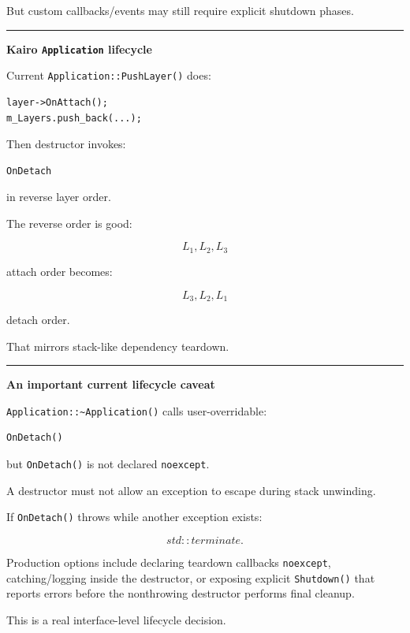 But custom callbacks/events may still require explicit shutdown phases.

\begin{center}\rule{0.5\linewidth}{0.5pt}\end{center}

\textbf{Kairo \texttt{Application} lifecycle}

Current \texttt{Application::PushLayer()} does:

\begin{verbatim}
layer->OnAttach();
m_Layers.push_back(...);
\end{verbatim}

Then destructor invokes:

\begin{verbatim}
OnDetach
\end{verbatim}

in reverse layer order.

The reverse order is good:

\[
L_1,L_2,L_3
\]

attach order becomes:

\[
L_3,L_2,L_1
\]

detach order.

That mirrors stack-like dependency teardown.

\begin{center}\rule{0.5\linewidth}{0.5pt}\end{center}

\textbf{An important current lifecycle caveat}

\texttt{Application::\textasciitilde{}Application()} calls user-overridable:

\begin{verbatim}
OnDetach()
\end{verbatim}

but \texttt{OnDetach()} is not declared \texttt{noexcept}.

A destructor must not allow an exception to escape during stack unwinding.

If \texttt{OnDetach()} throws while another exception exists:

\[
std::terminate.
\]

Production options include declaring teardown callbacks \texttt{noexcept}, catching/logging inside the destructor, or exposing explicit \texttt{Shutdown()} that reports errors before the nonthrowing destructor performs final cleanup.

This is a real interface-level lifecycle decision.

